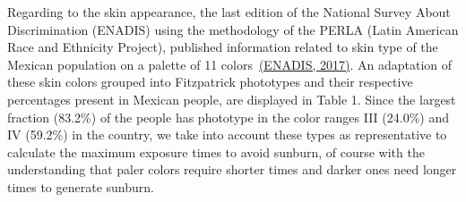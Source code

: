 \documentclass[10pt]{article}
\begin{document}
Regarding to the skin appearance, the last edition of the National
Survey About Discrimination (ENADIS) using the methodology of the PERLA
(Latin American Race and Ethnicity Project), published information
related to skin type of the Mexican population on a palette of 11
colors~\hyperref[csl:49]{(ENADIS, 2017)}. An adaptation of these skin colors grouped
into Fitzpatrick phototypes and their respective percentages present in
Mexican people, are displayed in Table 1. Since the largest fraction
(83.2\%) of the people has phototype in the color ranges III (24.0\%)
and IV (59.2\%) in the country, we take into account these types as
representative to calculate the maximum exposure times to avoid sunburn,
of course with the understanding that paler colors require shorter times
and darker ones need longer times to generate sunburn.
\end{document}
